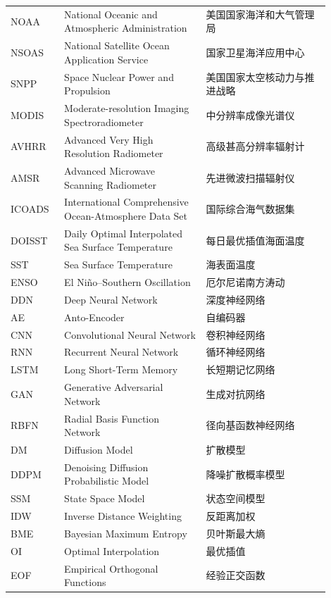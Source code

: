 \begin{abbreviation}
\begin{longtable}{>{\centering\arraybackslash}m{0.15\linewidth}>{\centering\arraybackslash}m{0.4\linewidth}>{\centering\arraybackslash}m{0.35\linewidth}}
    \midrule[1pt]
    \endfoot %
    \bottomrule[1pt]
    \endlastfoot

    \fontsize{12pt}{25.67pt}\selectfont
    NOAA& National Oceanic and Atmospheric Administration & 美国国家海洋和大气管理局\\
    NSOAS& National Satellite Ocean Application Service&国家卫星海洋应用中心\\
    SNPP & Space Nuclear Power and Propulsion& 美国国家太空核动力与推进战略\\
    MODIS&Moderate-resolution Imaging Spectroradiometer&中分辨率成像光谱仪\\
    AVHRR&Advanced Very High Resolution Radiometer&高级甚高分辨率辐射计\\
    AMSR&Advanced Microwave Scanning Radiometer&先进微波扫描辐射仪\\
    ICOADS&International Comprehensive Ocean-Atmosphere Data Set&国际综合海气数据集\\
    DOISST&Daily Optimal Interpolated Sea Surface Temperature&每日最优插值海面温度\\
    SST & Sea Surface Temperature & 海表面温度 \\
    ENSO&El Niño–Southern Oscillation &厄尔尼诺南方涛动\\
    DDN & Deep Neural Network & 深度神经网络 \\
    AE & Anto-Encoder &自编码器\\
    CNN & Convolutional Neural Network &  卷积神经网络 \\
    RNN &  Recurrent Neural Network &  循环神经网络  \\
    LSTM& Long Short-Term Memory&长短期记忆网络\\
    GAN &  Generative Adversarial Network & 生成对抗网络   \\
    RBFN & Radial Basis Function Network &径向基函数神经网络\\
    DM& Diffusion Model  &    扩散模型\\
    DDPM &Denoising Diffusion Probabilistic Model &降噪扩散概率模型\\
    SSM& State Space Model&状态空间模型\\
    IDW & Inverse Distance Weighting  &   反距离加权 \\
    BME & Bayesian Maximum Entropy &贝叶斯最大熵 \\
    OI & Optimal Interpolation &最优插值\\
    EOF&Empirical Orthogonal Functions   & 经验正交函数   \\

\end{longtable}
\end{abbreviation}
